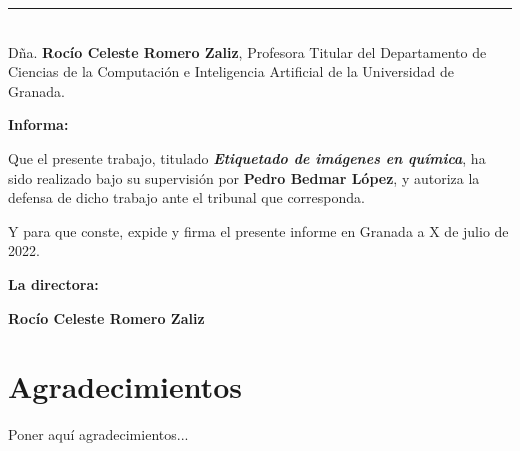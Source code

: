 \noindent\rule[-1ex]{\textwidth}{2pt}\\[4.5ex]

Dña. \textbf{Rocío Celeste Romero Zaliz}, Profesora Titular del Departamento de Ciencias de la Computación e Inteligencia Artificial de la Universidad de Granada.


\vspace{0.5cm}

\textbf{Informa:}

\vspace{0.5cm}

Que el presente trabajo, titulado \textit{\textbf{Etiquetado de imágenes en química}},
ha sido realizado bajo su supervisión por \textbf{Pedro Bedmar López}, y autoriza la defensa de dicho trabajo ante el tribunal que corresponda.

\vspace{0.5cm}

Y para que conste, expide y firma el presente informe en Granada a X de julio de 2022.

\vspace{1cm}

\textbf{La directora:}

\vspace{5cm}

\noindent \textbf{Rocío Celeste Romero Zaliz}

\chapter*{Agradecimientos}
\thispagestyle{empty}

       \vspace{1cm}


Poner aquí agradecimientos...

